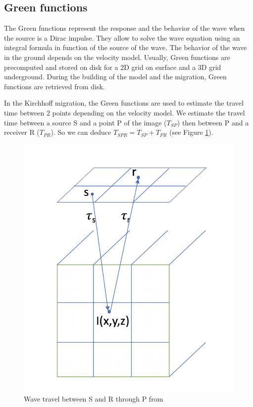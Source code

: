 \subsection{Green functions}
The Green functions represent the response and the behavior of the wave when the source is a Dirac impulse.
They allow to solve the wave equation using an integral formula in function of the source of the wave.
The behavior of the wave in the ground depends on the velocity model.
Usually, Green functions are precomputed and stored on disk for a 2D grid on surface and a 3D grid underground.
During the building of the model and the migration, Green functions are retrieved from disk.

In the Kirchhoff migration, the Green functions are used to estimate the travel time between 2 points depending on the velocity model.
We estimate the travel time between a source S and a point P of the image ($T_{SP}$) then between P and a receiver R ($T_{PR}$).
So we can deduce $T_{SPR} = T_{SP} + T_{PR}$ (see Figure \ref{fig:Green_functions1}).

\begin{figure}[H]
	\centering
	\includegraphics[scale=0.6]{img1}
	\caption{Wave travel between S and R through P\label{fig:Green_functions1} from \cite{rapport_Total_Petiton}}
\end{figure}

